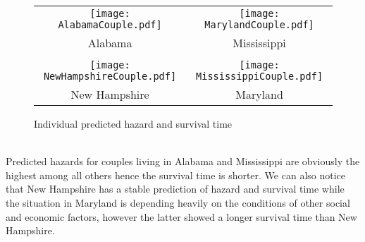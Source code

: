 \documentclass[10pt,twocolumn]{article}
\begin{document}
\begin{figure}[!htb]
\setlength{\tabcolsep}{.000001em}
\centering
\begin{tabular}{cc}
\texttt{[image: AlabamaCouple.pdf]} &
\texttt{[image: MarylandCouple.pdf]}\\
Alabama &   Mississippi\\
\\
\texttt{[image: NewHampshireCouple.pdf]}&
\texttt{[image: MississippiCouple.pdf]}\\
New Hampshire &  Maryland\\
\end{tabular}
\caption{Individual predicted hazard and survival time }
\label{Fig:predicted_hazard}
\end{figure}\\
Predicted hazards for couples living in Alabama and Mississippi are obviously the highest among all others hence the survival time is shorter. We can also notice that New Hampshire has a stable prediction of hazard and survival time while the situation in Maryland is depending heavily on the conditions of other social and economic factors, however the latter showed a longer survival time than New Hampshire.
\end{document}
